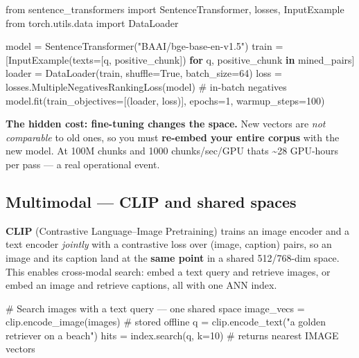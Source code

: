 \documentclass[11pt]{article}
\newenvironment{Shaded}{\begin{snugshade}}{\end{snugshade}}
\newcommand{\CommentTok}[1]{\textcolor[rgb]{0.48,0.49,0.49}{#1}}
\newcommand{\ControlFlowTok}[1]{\textcolor[rgb]{0.99,0.74,0.29}{\textbf{#1}}}
\newcommand{\DecValTok}[1]{\textcolor[rgb]{0.96,0.45,0.00}{#1}}
\newcommand{\ImportTok}[1]{\textcolor[rgb]{0.15,0.68,0.38}{#1}}
\newcommand{\KeywordTok}[1]{\textcolor[rgb]{0.81,0.81,0.76}{\textbf{#1}}}
\newcommand{\NormalTok}[1]{\textcolor[rgb]{0.81,0.81,0.76}{#1}}
\newcommand{\OperatorTok}[1]{\textcolor[rgb]{0.81,0.81,0.76}{#1}}
\newcommand{\StringTok}[1]{\textcolor[rgb]{0.96,0.31,0.31}{#1}}
\newcommand{\VariableTok}[1]{\textcolor[rgb]{0.15,0.68,0.68}{#1}}
\begin{document}

\begin{Shaded}
\begin{Highlighting}[]
\ImportTok{from}\NormalTok{ sentence\_transformers }\ImportTok{import}\NormalTok{ SentenceTransformer, losses, InputExample}
\ImportTok{from}\NormalTok{ torch.utils.data }\ImportTok{import}\NormalTok{ DataLoader}

\NormalTok{model }\OperatorTok{=}\NormalTok{ SentenceTransformer(}\StringTok{"BAAI/bge{-}base{-}en{-}v1.5"}\NormalTok{)}
\NormalTok{train }\OperatorTok{=}\NormalTok{ [InputExample(texts}\OperatorTok{=}\NormalTok{[q, positive\_chunk]) }\ControlFlowTok{for}\NormalTok{ q, positive\_chunk }\KeywordTok{in}\NormalTok{ mined\_pairs]}
\NormalTok{loader }\OperatorTok{=}\NormalTok{ DataLoader(train, shuffle}\OperatorTok{=}\VariableTok{True}\NormalTok{, batch\_size}\OperatorTok{=}\DecValTok{64}\NormalTok{)}
\NormalTok{loss }\OperatorTok{=}\NormalTok{ losses.MultipleNegativesRankingLoss(model)   }\CommentTok{\# in{-}batch negatives}
\NormalTok{model.fit(train\_objectives}\OperatorTok{=}\NormalTok{[(loader, loss)], epochs}\OperatorTok{=}\DecValTok{1}\NormalTok{, warmup\_steps}\OperatorTok{=}\DecValTok{100}\NormalTok{)}
\end{Highlighting}
\end{Shaded}

\textbf{The hidden cost: fine-tuning changes the space.} New vectors are \emph{not comparable} to old ones, so you must \textbf{re-embed your entire corpus} with the new model. At 100M chunks and 1000 chunks/sec/GPU that\textquotesingle s \textasciitilde28 GPU-hours per pass --- a real operational event.

\subsection{Multimodal --- CLIP and shared spaces}\label{multimodal--clip-and-shared-spaces}

\textbf{CLIP} (Contrastive Language--Image Pretraining) trains an image encoder and a text encoder \emph{jointly} with a contrastive loss over (image, caption) pairs, so an image and its caption land at the \textbf{same point} in a shared 512/768-dim space. This enables cross-modal search: embed a text query and retrieve images, or embed an image and retrieve captions, all with one ANN index.


\begin{Shaded}
\begin{Highlighting}[]
\CommentTok{\# Search images with a text query — one shared space}
\NormalTok{image\_vecs }\OperatorTok{=}\NormalTok{ clip.encode\_image(images)        }\CommentTok{\# stored offline}
\NormalTok{q }\OperatorTok{=}\NormalTok{ clip.encode\_text(}\StringTok{"a golden retriever on a beach"}\NormalTok{)}
\NormalTok{hits }\OperatorTok{=}\NormalTok{ index.search(q, k}\OperatorTok{=}\DecValTok{10}\NormalTok{)                   }\CommentTok{\# returns nearest IMAGE vectors}
\end{Highlighting}
\end{Shaded}
\end{document}

